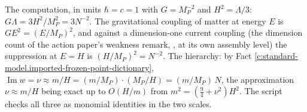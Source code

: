 \documentclass[11pt]{article}
\theoremstyle{definition}
\theoremstyle{plain}
\begin{document}
\label{c:note.standard-model.setting-one-number}
The computation, in units $\hbar = c = 1$ with $G = M_{P}^{-2}$ and $H^{2} = \Lambda/3$: $G\Lambda = 3H^{2}/M_{P}^{2} = 3N^{-2}$. The gravitational coupling of matter at energy $E$ is $GE^{2} = (E/M_{P})^{2}$, and against a dimension-one current coupling (the dimension count of the action paper's weakness remark, \cite[Rem.~5.3]{ButlerT10}, at its own assembly level) the suppression at $E = H$ is $(H/M_{P})^{2} = N^{-2}$. The hierarchy: by Fact \ref{c:standard-model.imported-frozen-point-dictionary}, $\operatorname{Im} w = \nu \approx m/H = (m/M_{P}) \cdot (M_{P}/H) = (m/M_{P})\,N$, the approximation $\nu \approx m/H$ being exact up to $O(H/m)$ from $m^{2} = (\tfrac94 + \nu^{2})H^{2}$. The script checks all three as monomial identities in the two scales.
\end{document}
